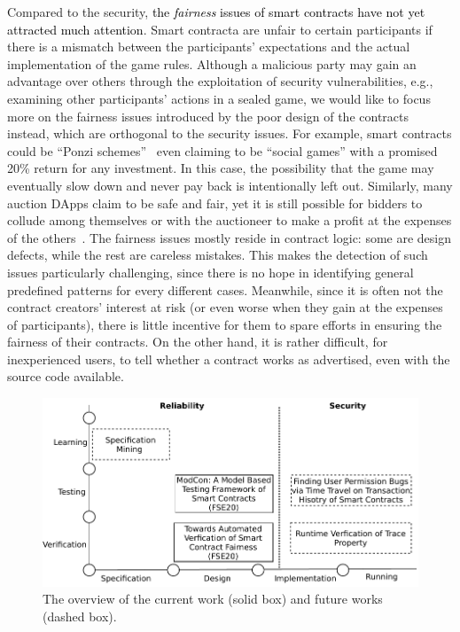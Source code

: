 Compared to the security, \textcolor{black}{the \emph{fairness} issues of smart contracts have not yet attracted much attention}.
Smart contracta are unfair to certain participants if there is a mismatch between the participants' expectations and the actual implementation of the game rules.
Although a malicious party may gain an advantage over others through the exploitation of security vulnerabilities, e.g., examining other participants' actions in a sealed game,
we would like to focus more on the fairness issues introduced by the poor design of the contracts instead, which are orthogonal to the security issues.
For example, smart contracts could be ``Ponzi schemes''~\cite{BARTOLETTI2020259} even claiming to be ``social games'' with a promised 20\% return for any investment.
In this case, the possibility that the game may eventually slow down and never pay back is intentionally left out.
Similarly, many auction DApps claim to be safe and fair, yet it is still possible for bidders to collude among themselves or with the auctioneer to make a profit at the expenses of the others~\cite{wu2018cream}.
The fairness issues mostly reside in contract logic: some are design defects, while the rest are careless mistakes.
This makes the detection of such issues particularly challenging, since there is no hope in identifying general predefined patterns for every different cases.
Meanwhile, since it is often not the contract creators' interest at risk (or even worse when they gain at the expenses of participants), there is little incentive for them to spare efforts in ensuring the fairness of their contracts.
On the other hand, it is rather difficult, for inexperienced users, to tell whether a contract works as advertised, even with the source code available.

\begin{figure}
	\centering
	\includegraphics{./Figures/Chapter1/ThesisOverview}
	\caption{The overview of the current work (solid box) and future works (dashed box).}
	\label{fig: thesisoverview}
\end{figure}

